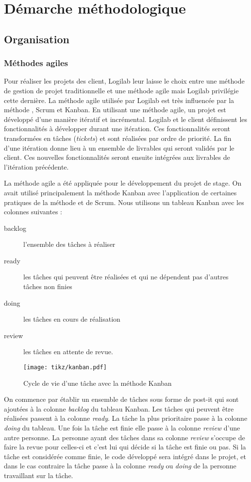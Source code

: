 \chapter{Démarche méthodologique}
\section{Organisation}
\subsection{Méthodes agiles}
Pour réaliser les projets des client, Logilab leur laisse le choix entre une méthode de gestion de projet traditionnelle et une méthode agile mais Logilab privilégie cette dernière. La méthode agile utilisée par Logilab est très influencée par la méthode , Scrum et Kanban. En utilisant une méthode agile, un projet est développé d'une manière itératif et incrémental. Logilab et le client définissent les fonctionnalités à développer durant une itération. Ces fonctionnalités seront transformées en tâches (\textit{tickets}) et sont réalisées par ordre de priorité. La fin d'une itération donne lieu à un ensemble de livrables qui seront validés par le client. Ces nouvelles fonctionnalités seront ensuite intégrées aux livrables de l'itération précédente.

La méthode agile a été appliquée pour le développement du projet de stage. On avait utilisé principalement la méthode Kanban avec l'application de certaines pratiques de la méthode  et de Scrum. Nous utilisons un tableau Kanban avec les colonnes suivantes : 
\begin{description}
	\item[backlog] l'ensemble des tâches à réaliser
	\item[ready] les tâches qui peuvent être réalisées et qui ne dépendent pas d'autres tâches non finies
	\item[doing] les tâches en cours de réalisation
	\item[review] les tâches en attente de revue.
\end{description}
\begin{figure}
\centering
  \texttt{[image: tikz/kanban.pdf]}
  \caption{Cycle de vie d'une tâche avec la méthode Kanban}
  \label{fig:kanban}
\end{figure}
On commence par établir un ensemble de tâches sous forme de post-it qui sont ajoutées à la colonne \textit{backlog} du tableau Kanban. Les tâches qui peuvent être réalisées passent à la colonne \textit{ready}. La tâche la plus prioritaire passe à la colonne \textit{doing} du tableau. Une fois la tâche est finie elle passe à la colonne \textit{review} d'une autre personne. La personne ayant des tâches dans sa colonne \textit{review} s'occupe de faire la revue pour celles-ci et c'est lui qui décide si la tâche est finie ou pas. Si la tâche est considérée comme finie, le code développé sera intégré dans le projet, et dans le cas contraire la tâche passe à la colonne \textit{ready} ou \textit{doing} de la personne travaillant sur la tâche. 

